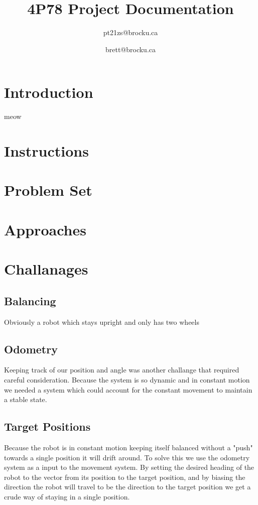 \documentclass[conference]{IEEEtran}
\begin{document}
\title{4P78 Project Documentation\\}

\author{
    pt21zs@brocku.ca
    \and
    brett@brocku.ca
}
\maketitle

\section{Introduction}
meow

\section{Instructions}
\section{Problem Set}
\section{Approaches}
\section{Challanages}

\subsection{Balancing}
Obviously a robot which stays upright and only has two wheels 
\subsection{Odometry}
Keeping track of our position and angle was another challange that required careful consideration. Because the system is so dynamic and in constant motion we needed a system which could account for the constant movement to maintain a stable state.
\subsection{Target Positions}
Because the robot is in constant motion keeping itself balanced without a "push" towards a single position it will drift around. To solve this we use the odometry system as a input to the movement system. By setting the desired heading of the robot to the vector from its position to the target position, and by biasing the direction the robot will travel to be the direction to the target position we get a crude way of staying in a single position.
\end{document}
